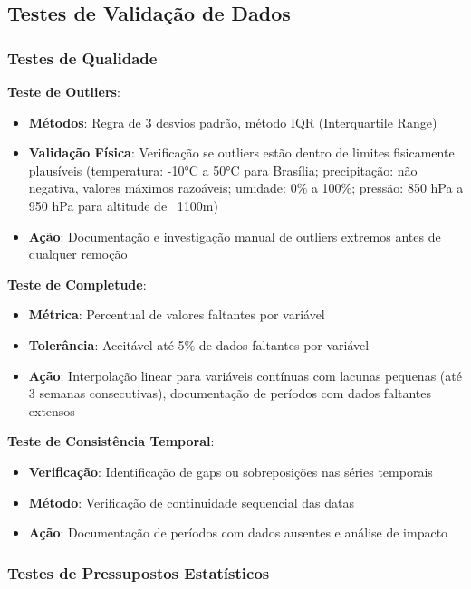 \subsection{Testes de Validação de Dados}

\subsubsection{Testes de Qualidade}

\textbf{Teste de Outliers}:
\begin{itemize}
    \item \textbf{Métodos}: Regra de 3 desvios padrão, método IQR (Interquartile Range)
    \item \textbf{Validação Física}: Verificação se outliers estão dentro de limites fisicamente plausíveis (temperatura: -10°C a 50°C para Brasília; precipitação: não negativa, valores máximos razoáveis; umidade: 0\% a 100\%; pressão: 850 hPa a 950 hPa para altitude de ~1100m)
    \item \textbf{Ação}: Documentação e investigação manual de outliers extremos antes de qualquer remoção
\end{itemize}

\textbf{Teste de Completude}:
\begin{itemize}
    \item \textbf{Métrica}: Percentual de valores faltantes por variável
    \item \textbf{Tolerância}: Aceitável até 5\% de dados faltantes por variável
    \item \textbf{Ação}: Interpolação linear para variáveis contínuas com lacunas pequenas (até 3 semanas consecutivas), documentação de períodos com dados faltantes extensos
\end{itemize}

\textbf{Teste de Consistência Temporal}:
\begin{itemize}
    \item \textbf{Verificação}: Identificação de gaps ou sobreposições nas séries temporais
    \item \textbf{Método}: Verificação de continuidade sequencial das datas
    \item \textbf{Ação}: Documentação de períodos com dados ausentes e análise de impacto
\end{itemize}

\subsubsection{Testes de Pressupostos Estatísticos}

